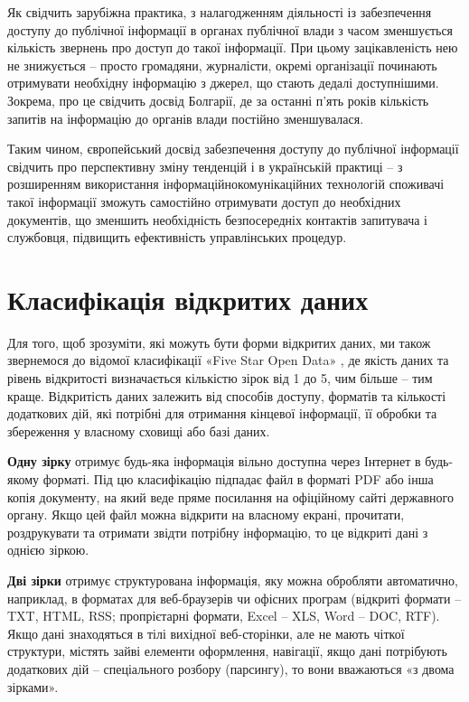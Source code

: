 Як свідчить зарубіжна практика, з налагодженням діяльності із
забезпечення доступу до публічної інформації в органах публічної
влади з часом зменшується кількість звернень про доступ до такої
інформації. При цьому зацікавленість нею не знижується – просто
громадяни, журналісти, окремі організації починають отримувати
необхідну інформацію з джерел, що стають дедалі доступнішими.
Зокрема, про це свідчить досвід Болгарії, де за останні п’ять років
кількість запитів на інформацію до органів влади постійно зменшувалася.

Таким чином, європейський досвід забезпечення доступу до
публічної інформації свідчить про перспективну зміну тенденцій і в
українській практиці – з розширенням використання інформаційнокомунікаційних
технологій споживачі такої інформації зможуть самостійно отримувати доступ
до необхідних документів, що зменшить необхідність безпосередніх контактів
запитувача і службовця, підвищить ефективність управлінських процедур.

\section{Класифікація відкритих даних}

Для того, щоб зрозуміти, які можуть бути форми відкритих даних, ми також звернемося до
відомої класифікації «Five Star Open Data» \cite{5StarData}, де якість даних та рівень
відкритості визначається кількістю зірок від 1 до 5, чим більше – тим краще. Відкритість
даних залежить від способів доступу, форматів та кількості додаткових дій, які потрібні для
отримання кінцевої інформації, її обробки та збереження у власному сховищі або базі даних.

\textbf{Одну зірку} отримує будь-яка інформація вільно доступна через Інтернет в будь-якому
форматі. Під цю класифікацію підпадає файл в форматі PDF або інша копія
документу, на який веде пряме посилання на офіційному сайті державного органу. Якщо
цей файл можна відкрити на власному екрані, прочитати, роздрукувати та отримати звідти
потрібну інформацію, то це відкриті дані з однією зіркою.

\textbf{Дві зірки} отримує структурована інформація, яку можна обробляти автоматично, наприклад,
в форматах для веб-браузерів чи офісних програм (відкриті формати – TXT, HTML,
RSS; пропрієтарні формати, Excel – XLS, Word – DOC, RTF). Якщо дані знаходяться в тілі
вихідної веб-сторінки, але не мають чіткої структури, містять зайві елементи оформлення,
навігації, якщо дані потрібують додаткових дій – спеціального розбору (парсингу), то вони
вважаються «з двома зірками».

